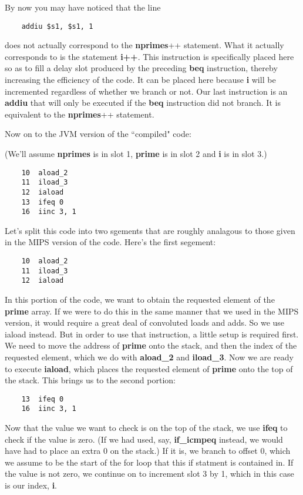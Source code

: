 \documentclass[11pt]{article}
\begin{document}
By now you may have noticed that the line

\begin{verbatim}
    addiu $s1, $s1, 1
\end{verbatim}

does not actually correspond to the \textbf{nprimes}++ statement. What it actually corresponds to is the statement \textbf{i++}. This instruction is specifically placed here so as to fill a delay slot produced by the preceding \textbf{beq} instruction, thereby increasing the efficiency of the code. It can be placed here because \textbf{i} will be incremented regardless of whether we branch or not. Our last instruction is an \textbf{addiu} that will only be executed if the \textbf{beq} instruction did not branch. It is equivalent to the \textbf{nprimes}++ statement.


Now on to the JVM version of the ``compiled" code:

(We'll assume \textbf{nprimes} is in slot 1, \textbf{prime} is in slot 2 and \textbf{i} is in slot 3.)

\begin{verbatim}
    10  aload_2
    11  iload_3
    12  iaload
    13  ifeq 0
    16  iinc 3, 1
\end{verbatim}

Let's split this code into two sgements that are roughly analagous to those given in the MIPS version of the code. Here's the first segement:

\begin{verbatim}
    10  aload_2
    11  iload_3
    12  iaload
\end{verbatim}

In this portion of the code, we want to obtain the requested element of the \textbf{prime} array. If we were to do this in the same manner that we used in the MIPS version, it would require a great deal of convoluted loads and adds. So we use iaload instead. But in order to use that instruction, a little setup is required first. We need to move the address of \textbf{prime} onto the stack, and then the index of the requested element, which we do with \textbf{aload\_2} and \textbf{iload\_3}. Now we are ready to execute \textbf{iaload}, which places the requested element of \textbf{prime} onto the top of the stack. This brings us to the second portion:

\begin{verbatim}
    13  ifeq 0
    16  iinc 3, 1
\end{verbatim}

Now that the value we want to check is on the top of the stack, we use \textbf{ifeq} to check if the value is zero. (If we had used, say, \textbf{if\_icmpeq} instead, we would have had to place an extra 0 on the stack.) If it is, we branch to offset 0, which we assume to be the start of the for loop that this if statment is contained in. If the value is not zero, we continue on to increment slot 3 by 1, which in this case is our index, \textbf{i}.
\end{document}

